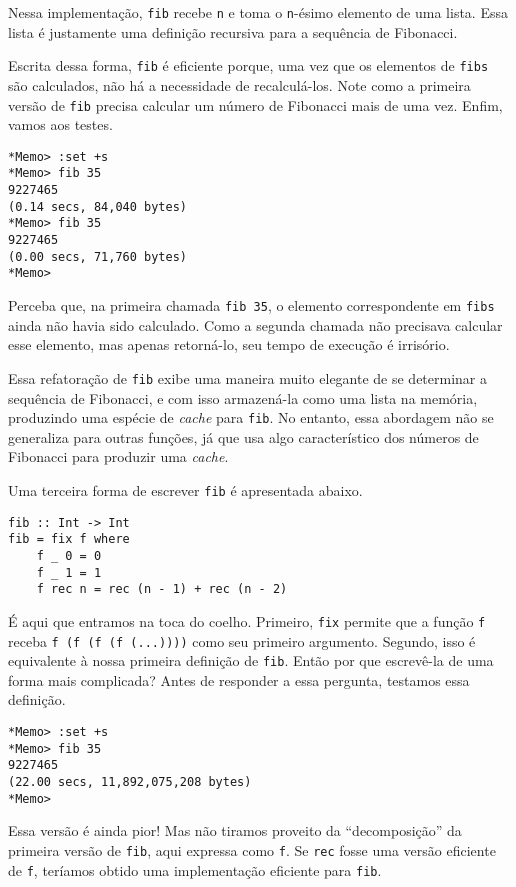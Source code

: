 \documentclass[a4paper]{article}
\begin{document}
Nessa implementação, \texttt{fib} recebe \texttt{n} e toma o \texttt{n}-ésimo elemento de uma lista.
Essa lista é justamente uma definição recursiva para a sequência de Fibonacci.

Escrita dessa forma, \texttt{fib} é eficiente porque, uma vez que os elementos de \texttt{fibs} são calculados, não há a necessidade de recalculá-los.
Note como a primeira versão de \texttt{fib} precisa calcular um número de Fibonacci mais de uma vez.
Enfim, vamos aos testes.

\begin{verbatim}
*Memo> :set +s
*Memo> fib 35
9227465
(0.14 secs, 84,040 bytes)
*Memo> fib 35
9227465
(0.00 secs, 71,760 bytes)
*Memo>
\end{verbatim}

Perceba que, na primeira chamada \texttt{fib 35}, o elemento correspondente em \texttt{fibs} ainda não havia sido calculado.
Como a segunda chamada não precisava calcular esse elemento, mas apenas retorná-lo, seu tempo de execução é irrisório.

Essa refatoração de \texttt{fib} exibe uma maneira muito elegante de se determinar a sequência de Fibonacci, e com isso armazená-la como uma lista na memória, produzindo uma espécie de \emph{cache} para \texttt{fib}.
No entanto, essa abordagem não se generaliza para outras funções, já que usa algo característico dos números de Fibonacci para produzir uma \emph{cache}.

Uma terceira forma de escrever \texttt{fib} é apresentada abaixo.

\begin{verbatim}
fib :: Int -> Int
fib = fix f where
	f _ 0 = 0
	f _ 1 = 1
	f rec n = rec (n - 1) + rec (n - 2)
\end{verbatim}

É aqui que entramos na toca do coelho.
Primeiro, \texttt{fix} permite que a função \texttt{f} receba \mbox{\texttt{f (f (f (f (...))))}} como seu primeiro argumento.
Segundo, isso é equivalente à nossa primeira definição de \texttt{fib}.
Então por que escrevê-la de uma forma mais complicada?
Antes de responder a essa pergunta, testamos essa definição.

\begin{verbatim}
*Memo> :set +s
*Memo> fib 35
9227465
(22.00 secs, 11,892,075,208 bytes)
*Memo>
\end{verbatim}

Essa versão é ainda pior!
Mas não tiramos proveito da ``decomposição'' da primeira versão de \texttt{fib}, aqui expressa como \texttt{f}.
Se \texttt{rec} fosse uma versão eficiente de \texttt{f}, teríamos obtido uma implementação eficiente para \texttt{fib}.
\end{document}
